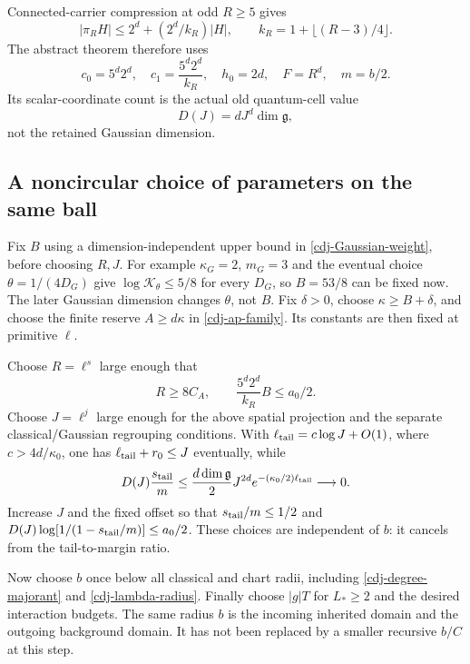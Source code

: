 Connected-carrier compression at odd $R\ge5$ gives
\[
 |\pi_RH|\le2^d+(2^d/k_R)|H|,
 \qquad k_R=1+\lfloor(R-3)/4\rfloor.
\]
The abstract theorem therefore uses
\begin{equation}\label{cdj-actual-constants}
 c_0=5^d2^d,\quad c_1=\frac{5^d2^d}{k_R},
 \quad h_0=2d,\quad F=R^d,\quad m=b/2.
\end{equation}
Its scalar-coordinate count is the actual old quantum-cell
value
\begin{equation}\label{cdj-D}
 D(J)=dJ^d\dim\mathfrak g,
\end{equation}
not the retained Gaussian dimension.

\subsection{A noncircular choice of parameters on the same ball}
\label{cdj-parameters-section}

Fix $B$ using a dimension-independent upper bound in
\eqref{cdj-Gaussian-weight}, before choosing $R,J$.
For example $\kappa_G=2$, $m_G=3$ and the eventual choice
$\theta=1/(4D_G)$ give $\log\mathcal K_\theta\le5/8$
for every $D_G$, so $B=53/8$ can be fixed now.
The later Gaussian dimension changes $\theta$, not $B$.
Fix $\delta>0$, choose $\kappa\ge B+\delta$, and choose
the finite reserve $A\ge d\kappa$ in
\eqref{cdj-ap-family}. Its constants are then fixed
at primitive $\ell$.

Choose $R=\ell^s$ large enough that
\begin{equation}\label{cdj-R-choice}
 R\ge8C_A,\qquad
 \frac{5^d2^d}{k_R}B\le a_0/2.
\end{equation}
Choose $J=\ell^j$ large enough for the above spatial
projection and the separate classical/Gaussian regrouping
conditions. With
$\ell_{\rm tail}=c\log J+O(1)$, where $c>4d/\kappa_0$,
one has $\ell_{\rm tail}+r_0\le J$ eventually, while
\begin{equation}\label{cdj-dimension-tail}
 D(J)\frac{s_{\rm tail}}m
 \le\frac{d\dim\mathfrak g}{2}J^{2d}
          e^{-(\kappa_0/2)\ell_{\rm tail}}\longrightarrow0.
\end{equation}
Increase $J$ and the fixed offset so that
$s_{\rm tail}/m\le1/2$ and
$D(J)\log[1/(1-s_{\rm tail}/m)]\le a_0/2$.
These choices are independent of $b$: it cancels from
the tail-to-margin ratio.

Now choose $b$ once below all classical and chart radii,
including \eqref{cdj-degree-majorant} and
\eqref{cdj-lambda-radius}. Finally choose $|g|T$ for
$L_*\ge2$ and the desired interaction budgets.
The same radius $b$ is the incoming inherited domain
and the outgoing background domain. It has not been
replaced by a smaller recursive $b/C$ at this step.

